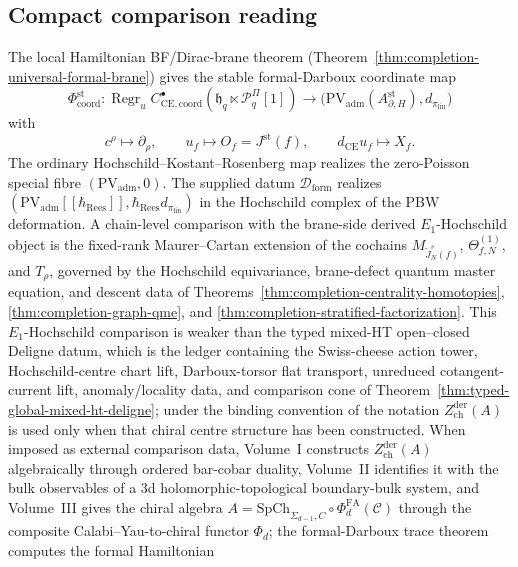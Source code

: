 \subsection{Compact comparison reading}
\label{ssec:completion-cross-target}

The local Hamiltonian BF/Dirac-brane theorem
(Theorem~\ref{thm:completion-universal-formal-brane}) gives the
stable formal-Darboux coordinate map
\[
  \Phi_{\mathrm{coord}}^{\mathrm{st}}\colon
  \operatorname{Regr}_u
  C^\bullet_{\mathrm{CE},\mathrm{coord}}
    (\mathfrak h_q\ltimes\mathcal P^\Pi_q[1])
  \longrightarrow
  \bigl(\mathrm{PV}_{\mathrm{adm}}
    (A_{\partial,H}^{\mathrm{st}}),
    d_{\pi_{\mathrm{lin}}}\bigr)
\]
with
\[
  c^\rho\longmapsto\partial_\rho,\qquad
  u_f\longmapsto O_f=J^{\mathrm{st}}(f),\qquad
  d_{\mathrm{CE}}u_f\longmapsto X_f.
\]
The ordinary Hochschild--Kostant--Rosenberg map realizes the
zero-Poisson special fibre
\((\mathrm{PV}_{\mathrm{adm}},0)\).  The supplied datum
\(\mathcal D_{\mathrm{form}}\) realizes
\((\mathrm{PV}_{\mathrm{adm}}[[\hbar_{\mathrm{Rees}}]],
\hbar_{\mathrm{Rees}}d_{\pi_{\mathrm{lin}}})\) in the Hochschild
complex of the PBW deformation.  A chain-level
comparison with the brane-side derived \(E_1\)-Hochschild object is
the fixed-rank Maurer--Cartan extension of the cochains
\(M_{\widetilde J_N^s(f)}\), \(\Theta^{(1)}_{f,N}\), and \(T_\rho\),
governed
by the Hochschild equivariance, brane-defect quantum master equation,
and descent data of
Theorems~\ref{thm:completion-centrality-homotopies},
\ref{thm:completion-graph-qme}, and
\ref{thm:completion-stratified-factorization}.  This \(E_1\)-Hochschild
comparison is weaker than the typed mixed-HT open--closed
Deligne datum, which is the ledger containing the Swiss-cheese action
tower, Hochschild-centre chart lift, Darboux-torsor flat transport,
unreduced cotangent-current lift, anomaly/locality data, and comparison
cone of Theorem~\ref{thm:typed-global-mixed-ht-deligne};
under the binding convention of 
the notation \(Z^{\mathrm{der}}_{\mathrm{ch}}(A)\) is used only when
that chiral centre structure has been constructed.
When imposed as external comparison data, Volume~I constructs
\(Z^{\mathrm{der}}_{\mathrm{ch}}(A)\) algebraically through ordered
bar-cobar duality, Volume~II identifies it with the bulk observables of
a 3d holomorphic-topological boundary-bulk system, and Volume~III gives
the chiral algebra
\(A=\mathrm{SpCh}_{\Sigma_{d-1},C}\circ\Phi^{\mathrm{FA}}_d(\mathcal C)\)
	through the composite Calabi--Yau-to-chiral functor
\(\Phi_d\); the formal-Darboux trace theorem computes the formal Hamiltonian
